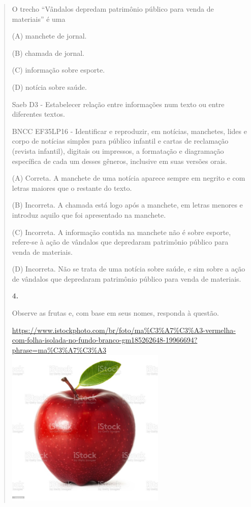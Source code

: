 \begin{quote}
O trecho ``Vândalos depredam patrimônio público para venda de
materiais'' é uma

(A) manchete de jornal.

(B) chamada de jornal.

(C) informação sobre esporte.

(D) notícia sobre saúde.

Saeb D3 - Estabelecer relação entre informações num texto ou entre
diferentes textos.

BNCC EF35LP16 - Identificar e reproduzir, em notícias, manchetes, lides
e corpo de notícias simples para público infantil e cartas de reclamação
(revista infantil), digitais ou impressos, a formatação e diagramação
específica de cada um desses gêneros, inclusive em suas versões orais.

(A) Correta. A manchete de uma notícia aparece sempre em negrito e com
letras maiores que o restante do texto.

(B) Incorreta. A chamada está logo após a manchete, em letras menores e
introduz aquilo que foi apresentado na manchete.

(C) Incorreta. A informação contida na manchete não é sobre esporte,
refere-se à \protect\hypertarget{_Hlk128473874}{}{}ação de vândalos que
depredaram patrimônio público para venda de materiais.

(D) Incorreta. Não se trata de uma notícia sobre saúde, e sim sobre a
ação de vândalos que depredaram patrimônio público para venda de
materiais.

\textbf{4.}

Observe as frutas e, com base em seus nomes, responda à questão.

\href{https://www.istockphoto.com/br/foto/ma\%C3\%A7\%C3\%A3-vermelha-com-folha-isolada-no-fundo-branco-gm185262648-19966694?phrase=ma\%C3\%A7\%C3\%A3}{https://www.istockphoto.com/br/foto/ma\%C3\%A7\%C3\%A3-vermelha-com-folha-isolada-no-fundo-branco-gm185262648-19966694?phrase=ma\%C3\%A7\%C3\%A3\includegraphics[width=2.98958in,height=2.98958in]{media/image38.jpeg}}


\end{quote}
